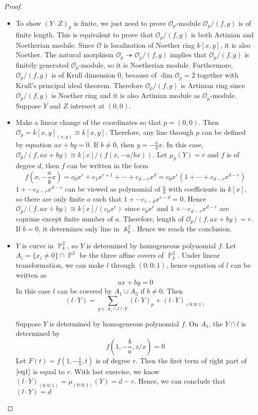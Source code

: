 \documentclass[12pt,a4paper]{article}
\theoremstyle{definition}
\DeclareMathOperator{\p}{\mathbb{P}}
\DeclareMathOperator{\A}{\mathbb{A}}
\begin{document}
\begin{proof}
	\begin{itemize}
	\item To show $(Y \cdot Z)_p$ is finite, we just need to prove $\mathcal{O}_p$-module $\mathcal{O}_p/(f,g)$ is of finite length. This is equivalent to prove that $\mathcal{O}_p/(f,g)$ is both Artinian and Noetherian module. Since $\mathcal{O}$ is localization of Noether ring $k[x,y]$, it is also Noether. The natural morphism $\mathcal{O}_p \twoheadrightarrow \mathcal{O}_p/(f,g)$ implies that $\mathcal{O}_p/(f,g)$ is finitely generated $\mathcal{O}_p$-module, so it is Noetherian module. Furthermore, $\mathcal{O}_p/(f,g)$ is of Krull dimension $0$, because of  $\dim \mathcal{O}_p=2$ together with Krull's principal ideal theorem. Therefore $\mathcal{O}_p/(f,g)$ is Artinian ring  since $\mathcal{O}_p/(f,g)$ is Noether ring and it is also Artinian module as $\mathcal{O}_p$-module. Suppose $Y$ and $Z$ intersect at $(0,0)$.
	\item Make a linear change of the coordinates so that $p=(0,0)$. Then $\mathcal{O}_p  = k[x,y]_{(x,y)} \cong k[x,y]$. Therefore, any line through $p$ can be defined by equation $ax+by =0$. If $b \neq 0$, then $y= -\frac{a}{b} x$. In this case, $\mathcal{O}_p/(f,ax+by) \cong k[x]/(f(x, -a/b x))$. Let $\mu_p(Y) = r$ and $f$ is of degree $d$, then $f$ can be written in the form
	\[
	f(x, -\frac{a}{b} x) = c_0 x^r + c_1 x^{r+1} + \cdots + c_{d-r}x^{d}= c_0 x^r(1+ \cdots + c_{d-r} x^{d-r})
	\]
	$1+ \cdots c_{d-r} x^{d-r}$ can be viewed as polynomial of $\frac{a}{b}$ with coefficients in $k[x]$, so there are only finite $a$ such that $1+ \cdots c_{r-d}x^{r-d} = 0$. Hence $\mathcal{O}_p/(f,ax+by) \cong k[x]/(c_0 x^r)$ since $c_0 x^r$ and $1+ \cdots c_{d-r}x^{d-r}$ are coprime except finite number of $a$. Therefore, length of $\mathcal{O}_p/(f,ax+by)=r$. If $b=0$, it determines only line in $\A^2_k$. Hence we reach the conclusion.
	\item $Y$ is curve in $\p_k^2$, so $Y$ is determined by homogeneous polynomial $f$. Let $A_i =\{x_i\neq 0\} \cap \p^2$ be the three affine covers of $\p_k^2$. Under linear transformation, we can make $l$ through $(0:0:1)$, hence equation of $l$ can be written as
	\[
	ax+by =0
	\]
	In this case $l$ can be covered by $A_1 \cup A_3$ if $b \neq 0$. Then
	\begin{equation}
	\label{eq1}
(l \cdot Y) =\sum_{p \in A_1 \cap l \cap Y} (l\cdot Y)_p + (l\cdot Y)_{(0:0:1)}
	\end{equation}
	
	Suppose $Y$ is determined by homogeneous polynomial $f$. On $A_1$, the $Y\cap l$ is determined by 
	\[
	f(1, -\frac{b}{a}, z/x) =0
	\]
	Let $F(t)= f(1, -\frac{1}{b},t)$ is of degree $r$. Then the first term of right part of $\ref{eq1}$ is equal to $r$. With last exercise, we know $(l\cdot Y)_{(0:0:1)} = \mu_{(0:0:1)}(Y)=d-r$.
	Hence, we can conclude that $(l\cdot Y) = d$
	\end{itemize}
\end{proof}
\end{document}
